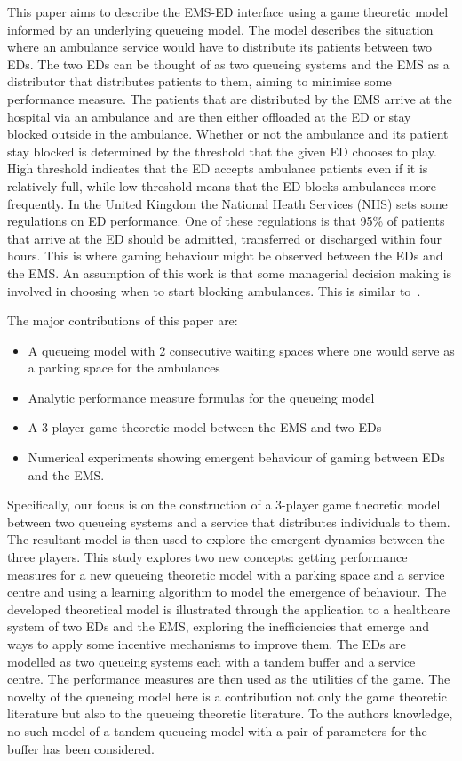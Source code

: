 This paper aims to describe the EMS-ED interface using a game theoretic model
informed by an underlying queueing model.
The model describes the situation where an ambulance service would
have to distribute its patients between two EDs.
The two EDs can be thought of as two queueing systems and the EMS as a 
distributor that distributes patients to them, aiming to minimise some
performance measure.
The patients that are distributed by the EMS arrive at the hospital via an 
ambulance and are then either offloaded at the ED or stay blocked outside in 
the ambulance.
Whether or not the ambulance and its patient stay blocked is determined by 
the threshold that the given ED chooses to play.
High threshold indicates that the ED accepts ambulance patients even if it is 
relatively full, while low threshold means that the ED blocks ambulances more 
frequently.
In the United Kingdom the National Heath Services (NHS) sets some regulations 
on ED performance.
One of these regulations is that 95\% of patients that arrive at the ED should 
be admitted, transferred or discharged within four hours.
This is where gaming behaviour might be observed between the EDs and the EMS.
An assumption of this work is that some managerial decision making is involved
in choosing when to start blocking ambulances.
This is similar to~\cite{deo2011centralized}.

The major contributions of this paper are:
\begin{itemize}
    \item A queueing model with 2 consecutive waiting spaces where one would 
    serve as a parking space for the ambulances
    \item Analytic performance measure formulas for the queueing model
    \item A 3-player game theoretic model between the EMS and two EDs
    \item Numerical experiments showing emergent behaviour of gaming between
    EDs and the EMS.
\end{itemize}
Specifically, our focus is on the construction of a 3-player game theoretic 
model between two queueing systems and a service that distributes individuals
to them. 
The resultant model is then used to explore the emergent dynamics between 
the three players.
This study explores two new concepts: getting performance measures for a new
queueing theoretic model with a parking space and a service centre and
using a learning algorithm to model the emergence of behaviour.
The developed theoretical model is illustrated through the application to 
a healthcare system of two EDs and the EMS, exploring the inefficiencies that 
emerge and ways to apply some incentive mechanisms to improve them.
The EDs are modelled as two queueing systems each with a tandem buffer and a 
service centre.
The performance measures are then used as the utilities of the game.
The novelty of the queueing model here is a contribution not only the game 
theoretic literature but also to the queueing theoretic literature.
To the authors knowledge, no such model of a tandem queueing model with a pair 
of parameters for the buffer has been considered.

